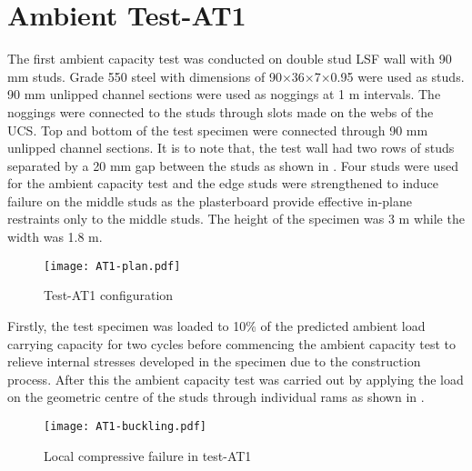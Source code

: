 \section{Ambient Test-AT1}\label{sec:AT1}

The first ambient capacity test was conducted on double stud LSF wall with 90 mm studs. Grade 550 steel with dimensions of 90\(\times\)36\(\times\)7\(\times\)0.95 were used as studs. 90 mm unlipped channel sections were used as noggings at 1 m intervals. The noggings were connected to the studs through slots made on the webs of the UCS. Top and bottom of the test specimen were connected through 90 mm unlipped channel sections. It is to note that, the test wall had two rows of studs separated by a 20 mm gap between the studs as shown in . Four studs were used for the ambient capacity test and the edge studs were strengthened to induce failure on the middle studs as the plasterboard provide effective in-plane restraints only to the middle studs. The height of the specimen was 3 m while the width was 1.8 m.  
\begin{figure}[!htbp]
	\centering
			\texttt{[image: AT1-plan.pdf]}\\
		\caption{Test-AT1 configuration}
		\label{fig:AT1-plan}
\end{figure} 

Firstly, the test specimen was loaded to 10\% of the predicted ambient load carrying capacity for two cycles before commencing the ambient capacity test to relieve internal stresses developed in the specimen due to the construction process. After this the ambient capacity test was carried out by applying the load on the geometric centre of the studs through individual rams as shown in .
\begin{figure}[!htbp]
	\centering
			\texttt{[image: AT1-buckling.pdf]}\\
		\caption{Local compressive failure in test-AT1}
		\label{fig:AT1-buckling}
\end{figure} 

